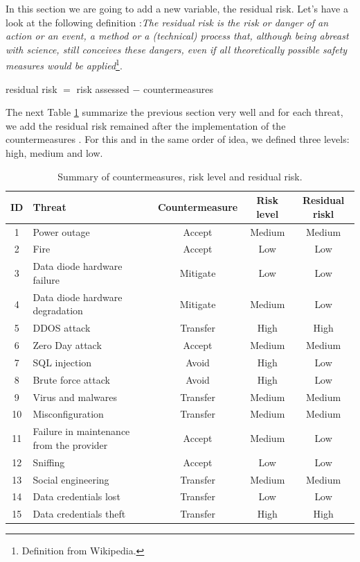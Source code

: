 \documentclass[a4paper,10pt]{article}
\begin{document}
In this section we are going to add a new variable, the residual risk. Let's have a look at the following definition :\emph{The residual risk is the risk or danger of an action or an event, a method or a (technical) process that, although being abreast with science, still conceives these dangers, even if all theoretically possible safety measures would be applied}\footnote{Definition from Wikipedia.}.
\begin{center}
residual risk $=$ risk assessed $-$ countermeasures
\end{center}

The next Table \ref{tab:riskresid} summarize the previous section very well and for each threat, we add the residual risk remained after the implementation of the countermeasures . For this and in the same order of idea, we defined three levels: high, medium and low.
\begin{table}[!h]
	\centering
\begin{tabular}{|c|p{4cm}|c|c|c|}
	\hline
	\textbf{ID}& \textbf{Threat}  & \textbf{Countermeasure} & \textbf{Risk level} & \textbf{Residual riskl}          \\
	\hline
	1 & Power outage & Accept & Medium & Medium \\
	\hline
	2 & Fire  & Accept & Low & Low \\
	\hline
	3 & Data diode hardware failure & Mitigate & Low & Low \\
	\hline
	4 & Data diode hardware degradation & Mitigate & Medium & Low  \\
	\hline
	5 & DDOS attack & Transfer & High & High \\
	\hline
	6 & Zero Day attack & Accept & Medium & Medium \\
	\hline
	7 &  SQL injection & Avoid & High & Low \\
	\hline
	8 & Brute force attack & Avoid & High & Low \\
	\hline
	9 & Virus and malwares & Transfer & Medium & Medium \\
	\hline
	10 & Misconfiguration & Transfer & Medium & Medium \\
	\hline
	11 & Failure in maintenance from the provider & Accept & Medium & Low \\
	\hline
	12 & Sniffing & Accept & Low & Low \\
	\hline
	13 & Social engineering & Transfer & Medium & Medium \\
	\hline
	14 & Data credentials lost & Transfer & Low & Low \\
	\hline
	15 & Data credentials theft & Transfer & High & High \\
	\hline
	\end{tabular}
	\caption{Summary of countermeasures, risk level and residual risk.}
	\label{tab:riskresid}

\end{table}
\end{document}
